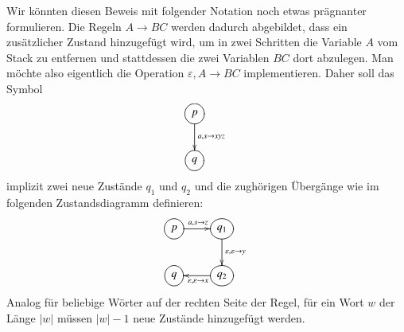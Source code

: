 Wir könnten diesen Beweis mit folgender Notation noch etwas
prägnanter formulieren.
Die Regeln $A\to BC$ werden dadurch abgebildet,
dass ein zusätzlicher Zustand hinzugefügt wird, um in zwei Schritten
die Variable $A$ vom Stack zu entfernen und stattdessen die zwei Variablen
$BC$ dort abzulegen.
Man möchte also eigentlich die Operation $\varepsilon,A\to BC$ implementieren.
Daher soll das Symbol
\[
\entrymodifiers={++[o][F]}
\xymatrix{
{p}\ar[d]^{a,s\to xyz}
\\
{q}
}
\]
implizit zwei neue Zustände $q_1$ und $q_2$ und die zughörigen
Übergänge wie im folgenden Zustandsdiagramm definieren:
\[
\entrymodifiers={++[o][F]}
\xymatrix{
{p}\ar[r]^{a,s\to z}
	&{q_1}\ar[d]^{\varepsilon,\varepsilon\to y}
\\
{q}
	&{q_2}\ar[l]^{\varepsilon,\varepsilon\to x}
}
\]
Analog für beliebige Wörter auf der rechten Seite der Regel,
für ein Wort $w$ der Länge $|w|$ müssen $|w|-1$ neue
Zustände hinzugefügt werden.

